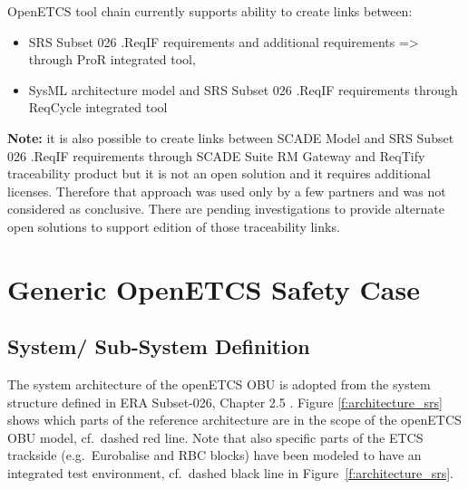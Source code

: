 \documentclass{template/openetcs_report}
\begin{document}
OpenETCS tool chain currently supports ability to create links between:
\begin{itemize}
\item SRS Subset 026 .ReqIF requirements and additional requirements => through ProR integrated tool,
\item SysML architecture model and SRS Subset 026 .ReqIF requirements through ReqCycle integrated tool
\end{itemize}
 
\textbf{Note:} it is also possible to create links between SCADE Model and SRS Subset 026 .ReqIF requirements through SCADE Suite RM Gateway and ReqTify traceability product but it is not an open solution and it requires additional licenses. Therefore that approach was used only by a few partners and was not considered as conclusive. There are pending investigations to provide alternate open solutions to support edition of those traceability links.




\chapter{Generic OpenETCS Safety Case}
\label{sec:hazardandrisk}

\section{System/ Sub-System Definition}

The system architecture of the openETCS OBU is adopted from the system structure defined in ERA Subset-026, Chapter 2.5 \cite{subset-026}. Figure \ref{f:architecture_srs} shows which parts of the reference architecture are in the scope of the openETCS OBU model, cf.~dashed red line. Note that also specific parts of the ETCS trackside (e.g.~Eurobalise and RBC blocks) have been modeled to have an integrated test environment, cf.~dashed black line in Figure~\ref{f:architecture_srs}.
\end{document}
